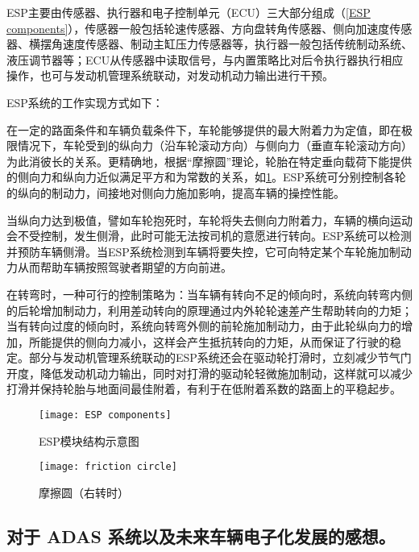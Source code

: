 \documentclass[UTF8]{ctexart}
\numberwithin{figure}{section}
\numberwithin{table}{section}
\begin{document}
ESP主要由传感器、执行器和电子控制单元（ECU）三大部分组成（\cref{ESP components}），传感器一般包括轮速传感器、方向盘转角传感器、侧向加速度传感器、横摆角速度传感器、制动主缸压力传感器等，执行器一般包括传统制动系统、液压调节器等；ECU从传感器中读取信号，与内置策略比对后令执行器执行相应操作，也可与发动机管理系统联动，对发动机动力输出进行干预。

ESP系统的工作实现方式如下：

在一定的路面条件和车辆负载条件下，车轮能够提供的最大附着力为定值，即在极限情况下，车轮受到的纵向力（沿车轮滚动方向）与侧向力（垂直车轮滚动方向）为此消彼长的关系。更精确地，根据“摩擦圆”理论，轮胎在特定垂向载荷下能提供的侧向力和纵向力近似满足平方和为常数的关系，如\cref{friction circle}。ESP系统可分别控制各轮的纵向的制动力，间接地对侧向力施加影响，提高车辆的操控性能。

当纵向力达到极值，譬如车轮抱死时，车轮将失去侧向力附着力，车辆的横向运动会不受控制，发生侧滑，此时可能无法按司机的意愿进行转向。ESP系统可以检测并预防车辆侧滑。当ESP系统检测到车辆将要失控，它可向特定某个车轮施加制动力从而帮助车辆按照驾驶者期望的方向前进。

在转弯时，一种可行的控制策略为：当车辆有转向不足的倾向时，系统向转弯内侧的后轮增加制动力，利用差动转向的原理通过内外轮轮速差产生帮助转向的力矩；当有转向过度的倾向时，系统向转弯外侧的前轮施加制动力，由于此轮纵向力的增加，所能提供的侧向力减小，这样会产生抵抗转向的力矩，从而保证了行驶的稳定。部分与发动机管理系统联动的ESP系统还会在驱动轮打滑时，立刻减少节气门开度，降低发动机动力输出，同时对打滑的驱动轮轻微施加制动，这样就可以减少打滑并保持轮胎与地面间最佳附着，有利于在低附着系数的路面上的平稳起步。

\begin{figure}[htbp]
	\centering
	\begin{minipage}[b]{0.59\textwidth}
		\centering
		\texttt{[image: ESP components]}
		\caption{ESP模块结构示意图}
		\label{ESP components}
	\end{minipage}
	\begin{minipage}[b]{0.4\textwidth}
		\centering
		\texttt{[image: friction circle]}
		\caption{摩擦圆（右转时）}
		\label{friction circle}
	\end{minipage}
\end{figure}

\subsection{对于 ADAS 系统以及未来车辆电子化发展的感想。}
\end{document}
